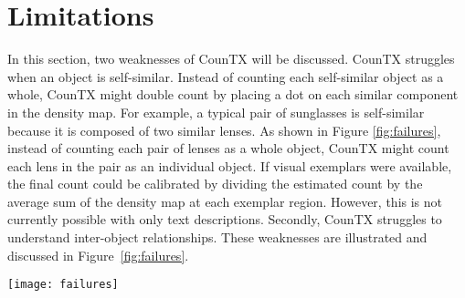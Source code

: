 \documentclass{bmvc2k}
\begin{document}
\newpage \section{Limitations}
\label{sec:failures}
In this section, two weaknesses of CounTX will be discussed. CounTX struggles when an object is self-similar. Instead of counting each self-similar object as a whole, CounTX might double count by placing a dot on each similar component in the density map. For example, a typical pair of sunglasses is self-similar because it is composed of two similar lenses. As shown in Figure \ref{fig:failures}, instead of counting each pair of lenses as a whole object, CounTX might count each lens in the pair as an individual object. If visual exemplars were available, the final count could be calibrated by dividing the estimated count by the average sum of the density map at each exemplar region. However, this is not currently possible with only text descriptions. Secondly, CounTX struggles to understand inter-object relationships. These weaknesses are illustrated and discussed in Figure~\ref{fig:failures}.

\begin{figure*}[h!]
\begin{center}
\texttt{[image: failures]}
\end{center}
   \caption{CounTX struggles to count self-similar objects. Instead of placing a dot on each pair of sunglasses in the density maps for the first image (from FSC-147 \cite{m_Ranjan-etal-CVPR21}) and the third image (from CountBench \cite{paiss2023countclip}), CounTX places a dot on each lens. This is why the estimated counts for these images are almost double the ground truth counts. Following this pattern, CounTX places a dot on each butterfly wing in the density map for the second image from CountBench above. This results in an estimated count that is almost twice the ground truth count. CounTX also struggles with inter-object relationships. This weakness surfaces when evaluating CounTX qualitatively on the CountBench subset as the text descriptions for images in the CountBench subset are more nuanced than the descriptions in FSC-147-D. In the rightmost image above from CountBench, CounTX incorrectly attempts to count all the cats in the image, real and illustrated, instead of just the real cats staring at the sign with an illustrated cat.}
\label{fig:failures}
\end{figure*}
\newpage 
\end{document}

